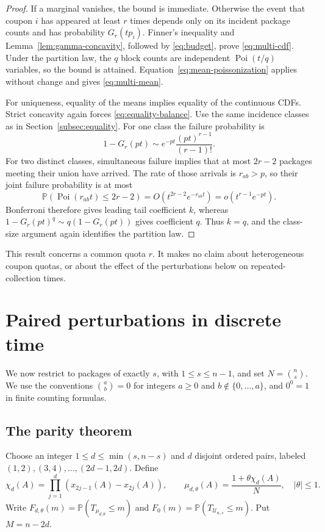 \documentclass[11pt]{article}
\numberwithin{equation}{section}
\theoremstyle{remark}
\newcommand{\Pp}{\mathbb P}
\newcommand{\1}{\mathbf 1}
\newcommand{\Poi}{\operatorname{Poi}}
\newcommand{\U}{\mathcal U}
\begin{document}
\begin{proof}
If a marginal vanishes, the bound is immediate. Otherwise the event that coupon $i$ has appeared at least $r$ times depends only on its incident package counts and has probability $G_r(tp_i)$. Finner's inequality and Lemma~\ref{lem:gamma-concavity}, followed by \eqref{eq:budget}, prove \eqref{eq:multi-cdf}. Under the partition law, the $q$ block counts are independent $\Poi(t/q)$ variables, so the bound is attained. Equation~\eqref{eq:mean-poissonization} applies without change and gives \eqref{eq:multi-mean}.

For uniqueness, equality of the means implies equality of the continuous CDFs. Strict concavity again forces \eqref{eq:equality-balance}. Use the same incidence classes as in Section~\ref{subsec:equality}. For one class the failure probability is
\[
 1-G_r(pt)\sim e^{-pt}\frac{(pt)^{r-1}}{(r-1)!}.
\]
For two distinct classes, simultaneous failure implies that at most $2r-2$ packages meeting their union have arrived. The rate of those arrivals is $r_{ab}>p$, so their joint failure probability is at most
\[
 \Pp(\Poi(r_{ab}t)\leq2r-2)
 =O(t^{2r-2}e^{-r_{ab}t})
 =o(t^{r-1}e^{-pt}).
\]
Bonferroni therefore gives leading tail coefficient $k$, whereas
$1-G_r(pt)^q\sim q(1-G_r(pt))$ gives coefficient $q$. Thus $k=q$, and the class-size argument again identifies the partition law.
\end{proof}

This result concerns a common quota $r$. It makes no claim about heterogeneous coupon quotas, or about the effect of the perturbations below on repeated-collection times.

\section{Paired perturbations in discrete time}\label{sec:paired}

We now restrict to packages of exactly $s$, with $1\leq s\leq n-1$, and set $N=\binom ns$. We use the conventions $\binom ab=0$ for integers $a\geq0$ and $b\notin\{0,\ldots,a\}$, and $0^0=1$ in finite counting formulas.

\subsection{The parity theorem}

Choose an integer $1\leq d\leq\min(s,n-s)$ and $d$ disjoint ordered pairs, labeled
$(1,2),(3,4),\ldots,(2d-1,2d)$. Define
\begin{equation}\label{eq:paired-law}
 \chi_d(A)=\prod_{j=1}^d(x_{2j-1}(A)-x_{2j}(A)),
 \qquad
 \mu_{d,\theta}(A)=\frac{1+\theta\chi_d(A)}{N},
 \quad |\theta|\leq1.
\end{equation}
Write $F_{d,\theta}(m)=\Pp(T_{\mu_{d,\theta}}\leq m)$ and
$F_0(m)=\Pp(T_{\U_{n,s}}\leq m)$. Put $M=n-2d$.
\end{document}
